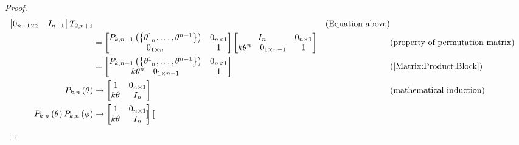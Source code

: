 \documentclass[stu, babel, american, biblatex, a4paper, leqno, draftall]{apa7}
\begin{document}
\begin{proof}
\begin{align*}
\begin{bmatrix}
            0_{{n-1}\times{2}}                  & {I}_{n-1}          \\
        \end{bmatrix}
        T_{2,n+1} && \text{(Equation above)} \\
        &=
        \begin{bmatrix}
            P_{k,n-1}\left(\left\{\tensor{\theta}{^1_{n}},\dots,\tensor{\theta}{^{n-1}}\right\}\right) & 0_{n\times 1} \\
            0_{1\times n}                                                                              & 1             \\
        \end{bmatrix}
        \begin{bmatrix}
            {I}_{n} & 0_{n \times1}          \\
            \begin{matrix*}k\tensor{\theta}{^n} & 0_{1\times n-1}\end{matrix*} & 1 \\
        \end{bmatrix} && \text{(property of permutation matrix)} \\
        &=
        \begin{bmatrix}
            P_{k,n-1}\left(\left\{\tensor{\theta}{^1_{n}},\dots,\tensor{\theta}{^{n-1}}\right\}\right) & 0_{n \times1}          \\
            \begin{matrix*}k\tensor{\theta}{^n} & 0_{1\times n-1}\end{matrix*} & 1 \\
        \end{bmatrix} && \text{(\cref{Matrix:Product:Block})} \\
        P_{k,n}\left(\tensor{\theta}{}\right)
        &\to
        \begin{bmatrix}
            1 & 0_{n \times1}          \\
            k\tensor{\theta}{} & I_n \\
        \end{bmatrix} && \text{(mathematical induction)} \\
        P_{k,n}\left(\tensor{\theta}{}\right) P_{k,n}\left(\tensor{\phi}{}\right)
        &\to
        \begin{bmatrix}
            1 & 0_{n \times1}          \\
            k\tensor{\theta}{} & I_n \\
        \end{bmatrix}\begin{bmatrix}

\end{bmatrix}
\end{align*}
\end{proof}
\end{document}
